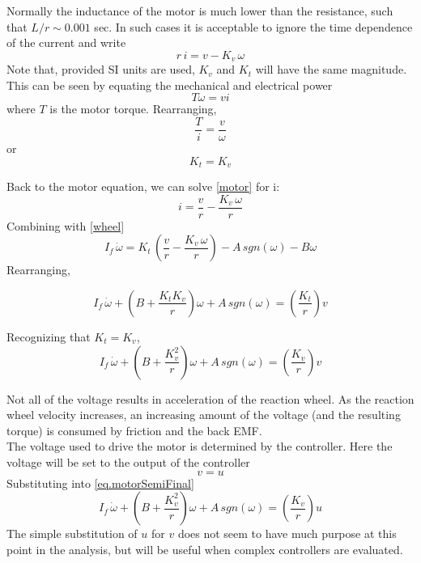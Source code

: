 \documentclass[12pt,letterpaper]{article}
\begin{document}
Normally the inductance of the motor is much lower than the resistance, such that $L/r \sim 0.001$ sec.  
In such cases it is acceptable to ignore the time dependence of the current and write
%
\begin{equation}
    r \,i = v - K_{v} \, \omega \label{motor}
\end{equation}
%
Note that, provided SI units are used, $K_{v}$ and $K_{t}$ will have the same magnitude.  This can be seen by equating the 
mechanical and electrical power
%
\begin{equation}
    T \omega = v i
\end{equation}
%
where $T$ is the motor torque.
Rearranging,
%
\begin{equation}
    \frac{T}{i} = \frac{v}{\omega}
\end{equation}
%
or
%
\begin{equation}
    K_{t} = K_{v} 
\end{equation}
%

Back to the motor equation, we can solve \eqref{motor} for i:
%
\begin{equation}
    i = \frac{v}{r} - \frac{K_{v} \, \omega}{r}
\end{equation}
%
Combining with \eqref{wheel}
%
\begin{equation}
    I_{f} \, \dot{\omega}  =  K_{t} \, \left( \frac{v}{r} - \frac{ K_{v} \, \omega}{r} \right) - A \, sgn(\omega ) - B \omega
\end{equation}
Rearranging,

\begin{equation}
    I_{f} \, \dot{\omega} + \left( B+\frac{K_{t} K_{v}}{r} \right) \omega +A \, sgn(\omega)= \left(\frac{K_{t}} {r}\right)v 
\end{equation}

Recognizing that $K_{t} = K_{v}$,
\begin{equation}
    I_{f} \, \dot{\omega} + \left( B+\frac{K_{v}^2}{r} \right) \omega +A \, sgn(\omega)= \left(\frac{K_{v}} {r}\right)v\label{eq.motorSemiFinal} 
\end{equation}

Not all of the voltage results in acceleration of the reaction wheel.  As the reaction wheel velocity increases, an
increasing amount of the voltage (and the resulting torque) is consumed by friction and the back EMF.\\

The voltage used to drive the motor is determined by the controller.  Here the voltage will be set to the output of the controller
\begin{equation}
    v = u 
\end{equation}
Substituting into \eqref{eq.motorSemiFinal}
\begin{equation}
    I_{f} \, \dot{\omega} + \left( B+\frac{K_{v}^2}{r} \right) \omega +A \, sgn(\omega)= \left(\frac{K_{v}} {r}\right)u\label{eq.motorFinal} 
\end{equation}
The simple substitution of $u$ for $v$ does not seem to have much purpose at this point in the analysis, but will be useful
when complex controllers are evaluated.\\
\end{document}
